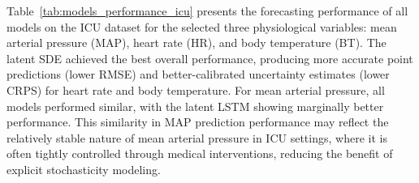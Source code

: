 \documentclass[preprint,12pt]{elsarticle}
\begin{document}
Table~\ref{tab:models_performance_icu} presents the forecasting performance of all models on the ICU dataset for the selected three physiological variables: mean arterial pressure (MAP), heart rate (HR), and body temperature (BT). The latent SDE achieved the best overall performance, producing more accurate point predictions (lower RMSE) and better-calibrated uncertainty estimates (lower CRPS) for heart rate and body temperature. For mean arterial pressure, all models performed similar, with the latent LSTM showing marginally better performance. This similarity in MAP prediction performance may reflect the relatively stable nature of mean arterial pressure in ICU settings, where it is often tightly controlled through medical interventions, reducing the benefit of explicit stochasticity modeling. 
\begin{table}[ht]
\centering
\caption{Performance comparison on PhysioNet 2012 ICU dataset for 24-hour vital sign forecasting. Three variables are predicted: mean arterial pressure (MAP), heart rate (HR), and body temperature (BT). Lower values indicate better performance for both RMSE and CRPS.}
\label{tab:models_performance_icu}
\end{table}
\end{document}
